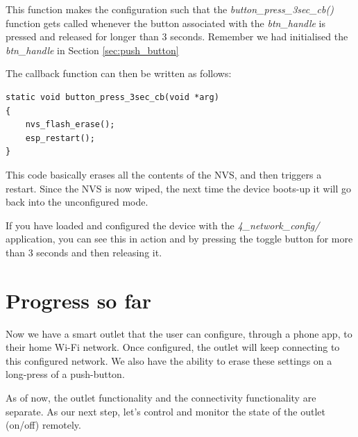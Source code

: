 \documentclass[main.tex]{subfiles}
\begin{document}
This function makes the configuration such that the \textit{button\_press\_3sec\_cb()} function gets called whenever the button associated with the \textit{btn\_handle} is pressed and released for longer than 3 seconds. Remember we had initialised the \textit{btn\_handle} in Section \ref{sec:push_button}

The callback function can then be written as follows:
\begin{verbatim}
static void button_press_3sec_cb(void *arg)
{
    nvs_flash_erase();
    esp_restart();
}
\end{verbatim}

This code basically erases all the contents of the NVS, and then triggers a restart. Since the NVS is now wiped, the next time the device boots-up it will go back into the unconfigured mode. 

If you have loaded and configured the device with the \textit{4\_network\_config/} application, you can see this in action and by pressing the toggle button for more than 3 seconds and then releasing it.

\section{Progress so far}
Now we have a smart outlet that the user can configure, through a phone app, to their home Wi-Fi network. Once configured, the outlet will keep connecting to this configured network. We also have the ability to erase these settings on a long-press of a push-button.

As of now, the outlet functionality and the connectivity functionality are separate. As our next step, let's control and monitor the state of the outlet (on/off) remotely.
\end{document}
